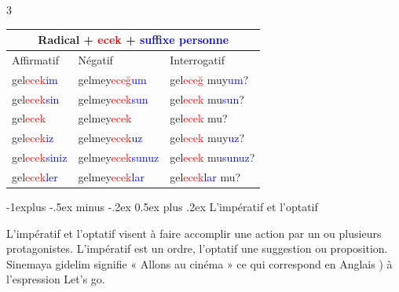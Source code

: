 \documentclass[10pt,landscape,letterpaper]{article}
\makeatletter
\renewcommand{\subsection}{\@startsection{subsection}{2}{0mm}%
                                {-1explus -.5ex minus -.2ex}%
                                {0.5ex plus .2ex}%
                                {\sffamily\normalsize\itshape}}
\makeatother
\begin{document}
\begin{multicols}{3}
\begin{tabular}{|lll|}
\hline
\multicolumn{3}{|c|}{Radical + \textcolor{red}{ecek} + \textcolor{blue}{suffixe personne}}                                                                    \\ \hline
\multicolumn{1}{|l|}{Affirmatif}   & \multicolumn{1}{l|}{Négatif}       & Interrogatif     \\ \hline \hline
\multicolumn{1}{|l|}{gel\textcolor{red}{ecek}\textcolor{blue}{im}}    & \multicolumn{1}{l|}{gelmey\textcolor{red}{eceğ}\textcolor{blue}{um}}    & gel\textcolor{red}{eceğ} muy\textcolor{blue}{um}?   \\ \hline
\multicolumn{1}{|l|}{gel\textcolor{red}{ecek}\textcolor{blue}{sin}}   & \multicolumn{1}{l|}{gelmey\textcolor{red}{ecek}\textcolor{blue}{sun}}   & gel\textcolor{red}{ecek} mu\textcolor{blue}{sun}?   \\ \hline
\multicolumn{1}{|l|}{gel\textcolor{red}{ecek}} & \multicolumn{1}{l|}{gelmey\textcolor{red}{ecek}}      & gel\textcolor{red}{ecek} mu?      \\ \hline
\multicolumn{1}{|l|}{gel\textcolor{red}{ecek}\textcolor{blue}{iz}}    & \multicolumn{1}{l|}{gelmey\textcolor{red}{ecek}\textcolor{blue}{uz}}    & gel\textcolor{red}{ecek} muy\textcolor{blue}{uz}?   \\ \hline
\multicolumn{1}{|l|}{gel\textcolor{red}{ecek}\textcolor{blue}{siniz}} & \multicolumn{1}{l|}{gelmey\textcolor{red}{ecek}\textcolor{blue}{sunuz}} & gel\textcolor{red}{ecek} mu\textcolor{blue}{sunuz}? \\ \hline
\multicolumn{1}{|l|}{gel\textcolor{red}{ecek}\textcolor{blue}{ler}}   & \multicolumn{1}{l|}{gelmey\textcolor{red}{ecek}\textcolor{blue}{lar}}   & gel\textcolor{red}{ecek}\textcolor{blue}{lar} mu?   \\ \hline
\end{tabular}


\subsection{L'impératif et l'optatif}


L'impératif et l'optatif visent à faire accomplir une action par un ou plusieurs protagonistes. L'impératif est un ordre, l'optatif une suggestion ou proposition. Sinemaya gidelim signifie « Allons au cinéma » ce qui correspond en Anglais ) à l'espression Let's go. 




\end{multicols}
\end{document}
